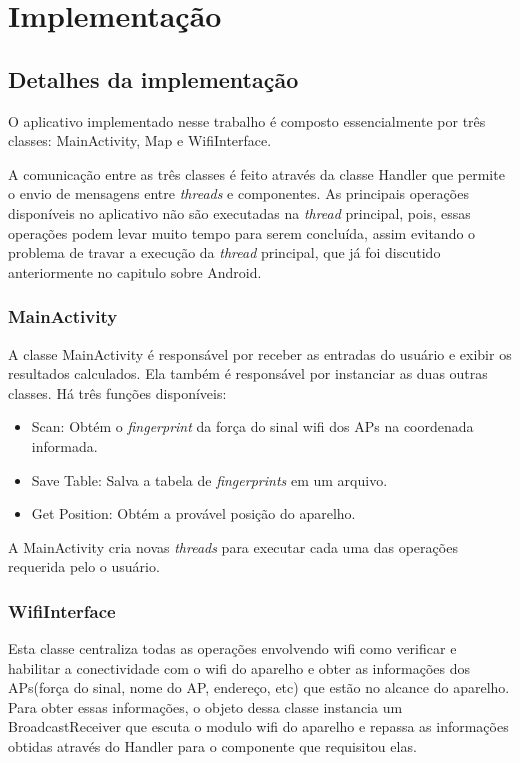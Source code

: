 \chapter{Implementação}	 
\label{implementacao}
  
\section{Detalhes da implementação}

  O aplicativo implementado nesse trabalho é composto essencialmente por três  classes: MainActivity, 
  Map e WifiInterface. 
  
  A comunicação entre as três classes é feito através da classe Handler\cite{handler} que permite o envio de 
  mensagens entre \textit{threads} e componentes. As principais operações disponíveis no aplicativo não 
  são executadas na \textit{thread} principal, pois, essas operações podem levar muito tempo para serem 
  concluída, assim evitando o problema de travar a execução da \textit{thread} principal, 
  que já foi discutido anteriormente no capitulo sobre Android.
  
  \subsection{MainActivity}
  A classe MainActivity é responsável por receber as entradas do usuário e exibir os resultados calculados.
  Ela também é responsável por instanciar as duas outras classes. Há três funções disponíveis: 
  \begin{itemize}
   \item Scan: Obtém o \textit{fingerprint} da força do sinal wifi dos APs na coordenada informada.
   \item Save Table: Salva a tabela de \textit{fingerprints} em um arquivo.
   \item Get Position: Obtém a provável posição do aparelho. 
  \end{itemize}

  A MainActivity cria novas \textit{threads} para executar cada uma das operações requerida pelo o usuário.
  
  \subsection{WifiInterface}
  
  Esta classe centraliza todas as operações envolvendo wifi como verificar e habilitar a conectividade
  com o wifi do aparelho e obter as informações dos APs(força do sinal, nome do AP, endereço, etc) 
  que estão no alcance do aparelho. Para obter essas informações, o objeto dessa classe
  instancia um BroadcastReceiver que escuta o modulo wifi do aparelho e repassa 
  as informações obtidas através do Handler para o componente que requisitou elas.
  
